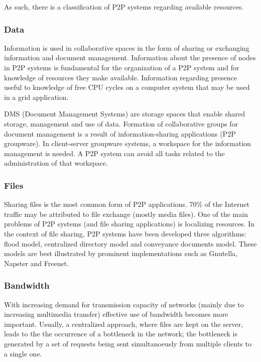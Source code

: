 As such, there is a classification of P2P systems regarding available resources.

\subsubsection{Data}

Information is used in collaborative spaces in the form of sharing or
exchanging information and document management. Information about the presence
of nodes in P2P systems is fundamental for the organization of a P2P system
and for knowledge of resources they make available. Information regarding
presence useful to knowledge of free CPU cycles on a computer system that may
be used in a grid application.

DMS (Document Management Systems) are storage spaces that enable shared
storage, management and use of data. Formation of collaborative groups for
document management is a result of information-sharing applications (P2P
groupware). In client-server groupware systems, a workspace for the
information management is needed. A P2P system can avoid all tasks related to
the administration of that workspace.

\subsubsection{Files}

Sharing files is the most common form of P2P applications. 70\% of the
Internet traffic may be attributed to file exchange (mostly media files). One
of the main problems of P2P systems (and file sharing applications) is
localizing resources. In the context of file sharing, P2P systems have been
developed three algorithms: flood model, centralized directory model and
conveyance documents model. These models are best illustrated by prominent
implementations such as Gnutella, Napster and Freenet.

\subsubsection{Bandwidth}

With increasing demand for transmission capacity of networks (mainly due to
increasing multimedia transfer) effective use of bandwidth becomes more
important. Usually, a centralized approach, where files are kept on the
server, leads to the the occurrence of a bottleneck in the network; the
bottleneck is generated by a set of requests being sent simultanoeusly from
multiple clients to a single one.

